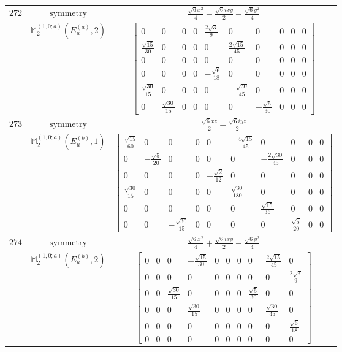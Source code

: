 \documentclass[fleqn,8pt,landscape]{jsarticle}
\begin{document}
\begin{longtable}{ccc}
$ 272 $ & $ \text{symmetry} $ & $ \frac{\sqrt{6} x^{2}}{4} - \frac{\sqrt{6} i x y}{2} - \frac{\sqrt{6} y^{2}}{4} $ \\
$  $ & $ \mathbb{M}_{2}^{(1,0;a)}(E_{u}^{(a)},2) $ & $ \begin{bmatrix} 0 & 0 & 0 & 0 & \frac{2 \sqrt{3}}{9} & 0 & 0 & 0 & 0 & 0 \\ \frac{\sqrt{15}}{30} & 0 & 0 & 0 & 0 & \frac{2 \sqrt{15}}{45} & 0 & 0 & 0 & 0 \\ 0 & 0 & 0 & 0 & 0 & 0 & 0 & 0 & 0 & 0 \\ 0 & 0 & 0 & 0 & - \frac{\sqrt{6}}{18} & 0 & 0 & 0 & 0 & 0 \\ \frac{\sqrt{30}}{15} & 0 & 0 & 0 & 0 & - \frac{\sqrt{30}}{45} & 0 & 0 & 0 & 0 \\ 0 & \frac{\sqrt{30}}{15} & 0 & 0 & 0 & 0 & - \frac{\sqrt{5}}{30} & 0 & 0 & 0 \end{bmatrix} $ \\ \hline
$ 273 $ & $ \text{symmetry} $ & $ \frac{\sqrt{6} x z}{2} - \frac{\sqrt{6} i y z}{2} $ \\
$  $ & $ \mathbb{M}_{2}^{(1,0;a)}(E_{u}^{(b)},1) $ & $ \begin{bmatrix} \frac{\sqrt{15}}{60} & 0 & 0 & 0 & 0 & - \frac{4 \sqrt{15}}{45} & 0 & 0 & 0 & 0 \\ 0 & - \frac{\sqrt{5}}{20} & 0 & 0 & 0 & 0 & - \frac{2 \sqrt{30}}{45} & 0 & 0 & 0 \\ 0 & 0 & 0 & 0 & - \frac{\sqrt{2}}{12} & 0 & 0 & 0 & 0 & 0 \\ \frac{\sqrt{30}}{15} & 0 & 0 & 0 & 0 & \frac{\sqrt{30}}{180} & 0 & 0 & 0 & 0 \\ 0 & 0 & 0 & 0 & 0 & 0 & \frac{\sqrt{15}}{36} & 0 & 0 & 0 \\ 0 & 0 & - \frac{\sqrt{30}}{15} & 0 & 0 & 0 & 0 & \frac{\sqrt{5}}{20} & 0 & 0 \end{bmatrix} $ \\ \hline
$ 274 $ & $ \text{symmetry} $ & $ \frac{\sqrt{6} x^{2}}{4} + \frac{\sqrt{6} i x y}{2} - \frac{\sqrt{6} y^{2}}{4} $ \\
$  $ & $ \mathbb{M}_{2}^{(1,0;a)}(E_{u}^{(b)},2) $ & $ \begin{bmatrix} 0 & 0 & 0 & - \frac{\sqrt{15}}{30} & 0 & 0 & 0 & 0 & \frac{2 \sqrt{15}}{45} & 0 \\ 0 & 0 & 0 & 0 & 0 & 0 & 0 & 0 & 0 & \frac{2 \sqrt{3}}{9} \\ 0 & 0 & \frac{\sqrt{30}}{15} & 0 & 0 & 0 & 0 & \frac{\sqrt{5}}{30} & 0 & 0 \\ 0 & 0 & 0 & \frac{\sqrt{30}}{15} & 0 & 0 & 0 & 0 & \frac{\sqrt{30}}{45} & 0 \\ 0 & 0 & 0 & 0 & 0 & 0 & 0 & 0 & 0 & \frac{\sqrt{6}}{18} \\ 0 & 0 & 0 & 0 & 0 & 0 & 0 & 0 & 0 & 0 \end{bmatrix} $ \\ \hline

\end{longtable}
\end{document}
